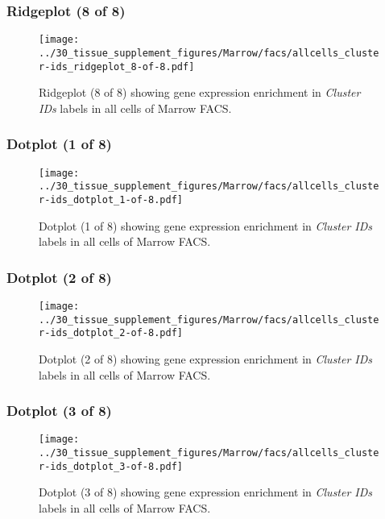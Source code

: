 \clearpage

\subsubsection{Ridgeplot (8 of 8)}
\begin{figure}[h]
\centering
\texttt{[image: ../30\_tissue\_supplement\_figures/Marrow/facs/allcells\_cluster-ids\_ridgeplot\_8-of-8.pdf]}

\caption{ Ridgeplot (8 of 8)  showing gene expression enrichment in \emph{Cluster IDs} labels in all cells of Marrow FACS. }
\end{figure}


\clearpage

\subsubsection{Dotplot (1 of 8)}
\begin{figure}[h]
\centering
\texttt{[image: ../30\_tissue\_supplement\_figures/Marrow/facs/allcells\_cluster-ids\_dotplot\_1-of-8.pdf]}

\caption{ Dotplot (1 of 8)  showing gene expression enrichment in \emph{Cluster IDs} labels in all cells of Marrow FACS. }
\end{figure}


\clearpage

\subsubsection{Dotplot (2 of 8)}
\begin{figure}[h]
\centering
\texttt{[image: ../30\_tissue\_supplement\_figures/Marrow/facs/allcells\_cluster-ids\_dotplot\_2-of-8.pdf]}

\caption{ Dotplot (2 of 8)  showing gene expression enrichment in \emph{Cluster IDs} labels in all cells of Marrow FACS. }
\end{figure}


\clearpage

\subsubsection{Dotplot (3 of 8)}
\begin{figure}[h]
\centering
\texttt{[image: ../30\_tissue\_supplement\_figures/Marrow/facs/allcells\_cluster-ids\_dotplot\_3-of-8.pdf]}

\caption{ Dotplot (3 of 8)  showing gene expression enrichment in \emph{Cluster IDs} labels in all cells of Marrow FACS. }
\end{figure}


